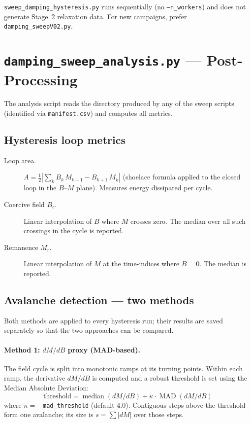 \documentclass[11pt,a4paper]{article}
\newcommand{\file}[1]{\texttt{#1}}
\newcommand{\param}[1]{\texttt{--#1}}
\begin{document}
\file{sweep\_damping\_hysteresis.py} runs sequentially (no \param{n\_workers})
and does not generate Stage~2 relaxation data.  For new campaigns, prefer
\file{damping\_sweepV02.py}.

\section{\texttt{damping\_sweep\_analysis.py} --- Post-Processing}
\label{sec:analysis}

The analysis script reads the directory produced by any of the sweep scripts
(identified via \texttt{manifest.csv}) and computes all metrics.

\subsection{Hysteresis loop metrics}

\begin{description}
  \item[Loop area.]  $\displaystyle A = \tfrac{1}{2}\left|\sum_{k} B_k\,M_{k+1} - B_{k+1}\,M_k\right|$
    (shoelace formula applied to the closed loop in the $B$--$M$ plane).
    Measures energy dissipated per cycle.

  \item[Coercive field $B_c$.]  Linear interpolation of $B$ where $M$ crosses
    zero.  The median over all such crossings in the cycle is reported.

  \item[Remanence $M_r$.]  Linear interpolation of $M$ at the time-indices
    where $B = 0$.  The median is reported.
\end{description}

\subsection{Avalanche detection --- two methods}

Both methods are applied to every hysteresis run; their results are saved
separately so that the two approaches can be compared.

\paragraph{Method 1: $dM/dB$ proxy (MAD-based).}
The field cycle is split into monotonic ramps at its turning points.  Within
each ramp, the derivative $dM/dB$ is computed and a robust threshold is set
using the Median Absolute Deviation:
\begin{equation}
  \text{threshold} = \operatorname{median}(dM/dB) + \kappa \cdot \operatorname{MAD}(dM/dB)
\end{equation}
where $\kappa = $ \param{mad\_threshold} (default 4.0).  Contiguous steps above
the threshold form one avalanche; its size is $s = \sum |dM|$ over those steps.
\end{document}
